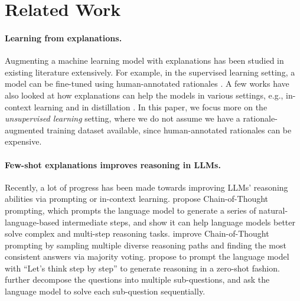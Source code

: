 \section{Related Work}
\label{sec:related_work}
\paragraph{Learning from explanations.}
Augmenting a machine learning model with explanations has been studied in existing literature extensively.
For example, in the supervised learning setting, a model can be fine-tuned using human-annotated rationales \citep{zaidan-etal-2007-using,ling-etal-2017-program,wt5,esnli,Cobbe2021TrainingVT,chung2022scaling}.
A few works have also looked at how explanations can help the models in various settings, e.g., in-context learning \citep{learn_from_explanation_in_context} and in distillation \citep{evaluate_explanations_distill}.
In this paper, we focus more on the \textit{unsupervised learning} setting, where we do not assume we have a rationale-augmented training dataset available, since human-annotated rationales can be expensive.

\paragraph{Few-shot explanations improves reasoning in LLMs.}
Recently, a lot of progress has been made towards improving LLMs' reasoning abilities via prompting or in-context learning.
\citet{Wei2022ChainOT} propose Chain-of-Thought prompting, which prompts the language model to generate a series of natural-language-based intermediate steps, and show it can help language models better solve complex and multi-step reasoning tasks.
\citet{Wang2022SelfConsistencyIC} improve Chain-of-Thought prompting by sampling multiple diverse reasoning paths and finding the most consistent answers via majority voting.
\citet{step_by_step} propose to prompt the language model with ``Let's think step by step'' to generate reasoning in a zero-shot fashion.
\citet{Zhou2022LeasttoMostPE} further decompose the questions into multiple sub-questions, and ask the language model to solve each sub-question sequentially.


